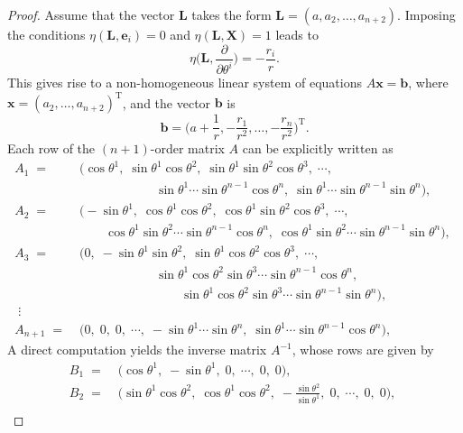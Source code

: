 \documentclass[reqno,11pt, letterpaper]{amsart}
\theoremstyle{plain}
\theoremstyle{definition}
\numberwithin{equation}{section}
\begin{document}
     \begin{proof}
     	Assume that the vector $\mathbf{L}$ takes the form $\mathbf{L}=(a,a_2,\dots,a_{n+2})$. Imposing the conditions $\eta(\mathbf{L},\mathbf{e}_i)=0$ and $\eta(\mathbf{L},\mathbf{X})=1$ leads to
     	\[
     	\eta\Big(\mathbf{L},\frac{\partial}{\partial \theta^i}\Big) = -\frac{r_i}{r}.
     	\]  
     	This gives rise to a non-homogeneous linear system of equations $A\mathbf{x}=\mathbf{b}$, where $\mathbf{x} = (a_2,\dots,a_{n+2})^\mathrm{T}$, and the vector $\mathbf{b}$ is
     	\[
     	\mathbf{b} = \Big(a+\frac{1}{r}, -\frac{r_1}{r^2},\dots,-\frac{r_n}{r^2}\Big)^\mathrm{T}.
     	\]  
     	Each row of the $(n+1)$-order matrix $A$ can be explicitly written as  
     	       \begin{align*}
     		A_1\;=\;&\Big(\cos\theta^1,\;\sin\theta^1\cos\theta^2,\; \sin\theta^1\sin\theta^2\cos\theta^3,\; \cdots,\; \\
     		&\qquad\qquad\qquad \sin\theta^1\cdots\sin\theta^{n-1}\cos\theta^n,\; \sin\theta^1\cdots\sin\theta^{n-1}\sin\theta^n \Big),\;\\
     		A_2\;=\;&\Big(-\sin\theta^1,\; \cos\theta^1\cos\theta^2,\; \cos\theta^1\sin\theta^2\cos\theta^3,\; \cdots,\; \\
     		&\qquad\cos\theta^1\sin\theta^2\cdots\sin\theta^{n-1}\cos\theta^n,\; \cos\theta^1\sin\theta^2\cdots\sin\theta^{n-1}\sin\theta^n\Big),\; \\
     		A_3\;=\;&\Big(0,\;-\sin\theta^1\sin\theta^2,\; \sin\theta^1\cos\theta^2\cos\theta^3,\; \cdots,\; \\
     		&\qquad\qquad\qquad \sin\theta^1\cos\theta^2\sin\theta^3\cdots\sin\theta^{n-1}\cos\theta^n,\; \\
     		&\qquad\qquad\qquad\qquad\sin\theta^1\cos\theta^2\sin\theta^3\cdots\sin\theta^{n-1}\sin\theta^n \Big),\;\\
     		\;\vdots&\\
     		A_{n+1}\;=\;&\Big(0,\; 0,\; 0,\; \cdots,\; -\sin\theta^1\cdots\sin\theta^n,\; \sin\theta^1\cdots\sin\theta^{n-1}\cos\theta^n \Big),\;
     	\end{align*}
     	A direct computation yields the inverse matrix $A^{-1}$, whose rows are given by  
     	 \begin{align*}
     		B_1\;=\;&\Big(\cos\theta^1,\;-\sin\theta^1,\; 0,\; \cdots,\;  0,\; 0 \Big),\;\\
     		B_2\;=\;&\Big(\sin\theta^1\cos\theta^2,\;\cos\theta^1\cos\theta^2,\; -\frac{\sin\theta^2}{\sin\theta^1},\; 0,\; \cdots,\; 0,\; 0\Big),\;\\

\end{align*}
\end{proof}
\end{document}
